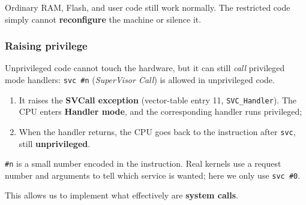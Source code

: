 \documentclass[a4paper,11pt]{article}
\begin{document}
Ordinary RAM, Flash, and user code still work normally. The restricted code simply cannot \textbf{reconfigure} the machine or silence it.

\subsubsection{Raising privilege}

Unprivileged code cannot touch the hardware, but it can still \textit{call} privileged mode handlers:
\texttt{svc \#n} (\textit{SuperVisor Call}) is allowed in unprivileged code.

\begin{enumerate}
	\item
	      It raises the \textbf{SVCall exception} (vector-table entry 11, \texttt{SVC\_Handler}).
	      The CPU enters \textbf{Handler mode}, and the corresponding handler runs privileged;
	\item
	      When the handler returns, the CPU goes back to the instruction after \texttt{svc}, still \textbf{unprivileged}.

\end{enumerate}

\texttt{\#n} is a small number encoded in the instruction. Real kernels use a request number and arguments to tell which service is wanted; here we only use \texttt{svc \#0}.

This allows us to implement what effectively are \textbf{system calls}.
\end{document}
